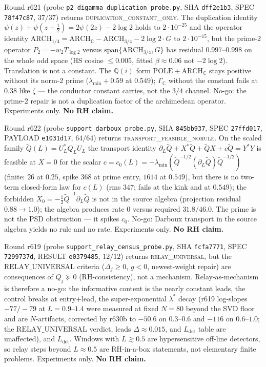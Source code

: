 \documentclass[11pt]{article}
\theoremstyle{definition}
\theoremstyle{remark}
\begin{document}
\noindent Round r621 (probe \texttt{p2\_digamma\_duplication\_probe.py},
SHA \texttt{dff2e1b3}, SPEC \texttt{78f47c87}, $37/37$) returns
\textsc{duplication\_constant\_only}.  The duplication identity
$\psi(z)+\psi(z+\tfrac12)=2\psi(2z)-2\log 2$ holds to
$2\cdot 10^{-25}$ and the operator identity
$\mathrm{ARCH}_{1/4}=\mathrm{ARCH}_{\mathbb C}-\mathrm{ARCH}_{3/4}
-2\log 2\cdot G$ to $2\cdot 10^{-15}$, but the prime-2 operator
$P_2=-w_2 T_{\log 2}$ versus $\mathrm{span}\{\mathrm{ARCH}_{3/4},G\}$
has residual $0.997$--$0.998$ on the whole odd space (HS cosine
$\le 0.005$, fitted $\beta\approx 0.06$ not $-2\log 2$).
Translation is not a constant.  The $\mathbb Q(i)$ form
$\mathrm{POLE}+\mathrm{ARCH}_{\mathbb C}$ stays positive without
its norm-$2$ prime ($\lambda_{\min}+0.59$ at $0.549$);
$\Gamma_{\mathbb C}$ without the constant fails at $0.38$ like
$\zeta$ --- the conductor constant carries, not the $3/4$
channel.  No-go: the prime-$2$ repair is not a duplication
factor of the archimedean operator.  Experiments only.
\textbf{No RH claim.}

\noindent Round r622 (probe \texttt{support\_darboux\_probe.py},
SHA \texttt{845bb937}, SPEC \texttt{27ffd017}, PAYLOAD
\texttt{e1031d17}, $64/64$) returns
\textsc{transport\_feasible\_norule}.  On the scaled family
$\widetilde Q(L)=U_L^*Q_L U_L$ the transport identity
$\partial_L\widetilde Q+X^*\widetilde Q+\widetilde Q X+c\widetilde Q=Y^*Y$
is feasible at $X=0$ for the scalar
$c=c_0(L)=-\lambda_{\min}(\widetilde Q^{-1/2}(\partial_L\widetilde Q)\widetilde Q^{-1/2})$
(finite: $26$ at $0.25$, spike $368$ at prime entry, $1614$ at
$0.549$), but there is no two-term closed-form law for $c(L)$
(rms $347$; fails at the kink and at $0.549$); the forbidden
$X_0=-\tfrac12\widetilde Q^{-1}\partial_L\widetilde Q$ is not in
the source algebra (projection residual $0.88\to 1.0$); the
algebra produces rate $0$ versus required $31.8/46.0$.  The
prime is not the PSD obstruction --- it spikes $c_0$.  No-go:
Darboux transport in the source algebra yields no rule and no
rate.  Experiments only.  \textbf{No RH claim.}

\noindent Round r619 (probe \texttt{support\_relay\_census\_probe.py},
SHA \texttt{fcfa7771}, SPEC \texttt{7299737d}, RESULT
\texttt{e0379485}, $12/12$) returns \textsc{relay\_universal},
but the $\mathrm{RELAY\_UNIVERSAL}$ criteria ($\Delta_j\ge 0$,
$g<0$, newest-weight repair) are consequences of $Q_j\succeq 0$
(RH-consistency), not a mechanism.  Relay-as-mechanism is
therefore a no-go: the informative content is the nearly
constant leads, the control breaks at entry+lead, the
super-exponential $\lambda^*$ decay (r619 log-slopes
$-77/-79$ at $L=0.9$--$1.4$ were measured at fixed $N=80$
beyond the SVD floor and are $N$-artifacts, corrected by
r630b to $-50.6$ on $0.3$--$0.6$ and $-116$ on $0.6$--$1.0$;
the $\mathrm{RELAY\_UNIVERSAL}$ verdict, leads
$\Delta\approx 0.015$, and $L_{\mathrm{det}}$ table are
unaffected), and $L_{\mathrm{det}}$.
Windows with $L\gtrsim 0.5$ are hypersensitive off-line
detectors, so relay steps beyond $L\approx 0.5$ are RH-in-a-box
statements, not elementary finite problems.  Experiments only.
\textbf{No RH claim.}
\end{document}
